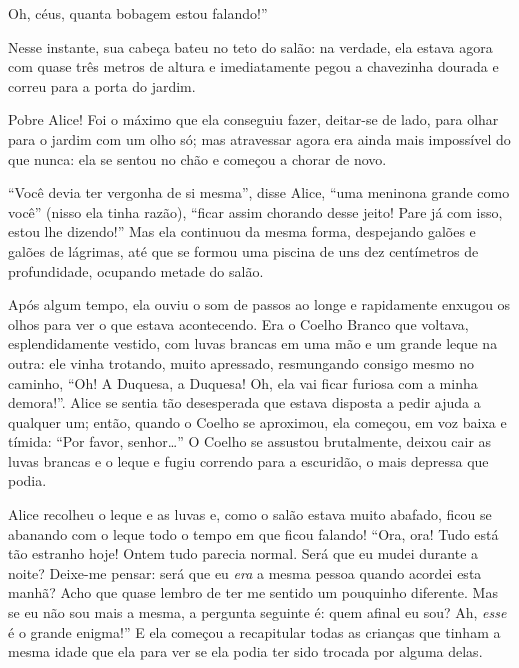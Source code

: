 Oh, céus, quanta bobagem estou falando!''

Nesse instante, sua cabeça bateu no teto do salão: na verdade, ela
estava agora com quase três metros de altura e imediatamente pegou
a chavezinha dourada e correu para a porta do jardim.

Pobre Alice! Foi o máximo que ela conseguiu fazer, deitar-se de lado,
para olhar para o jardim com um olho só; mas atravessar agora era ainda
mais impossível do que nunca: ela se sentou no chão e começou a chorar
de novo.

``Você devia ter vergonha de si mesma'', disse Alice, ``uma meninona
grande como você'' (nisso ela tinha razão), ``ficar assim chorando desse
jeito! Pare já com isso, estou lhe dizendo!'' Mas ela continuou da mesma
forma, despejando galões e galões de lágrimas, até que se formou uma
piscina de uns dez centímetros de profundidade, ocupando metade do
salão.

Após algum tempo, ela ouviu o som de passos ao longe e rapidamente
enxugou os olhos para ver o que estava acontecendo. Era o Coelho Branco
que voltava, esplendidamente vestido, com luvas brancas em uma mão e um
grande leque na outra: ele vinha trotando, muito apressado, resmungando
consigo mesmo no caminho, ``Oh! A Duquesa, a Duquesa! Oh, ela vai ficar
furiosa com a minha demora!''. Alice se sentia tão desesperada que
estava disposta a pedir ajuda a qualquer um; então, quando o Coelho se
aproximou, ela começou, em voz baixa e tímida: ``Por favor, senhor\ldots{}''
O Coelho se assustou brutalmente, deixou cair as luvas brancas e o
leque e fugiu correndo para a escuridão, o mais depressa que podia.

Alice recolheu o leque e as luvas e, como o salão estava muito abafado,
ficou se abanando com o leque todo o tempo em que ficou falando! ``Ora, ora!
Tudo está tão estranho hoje! Ontem tudo parecia normal. Será que eu
mudei durante a noite? Deixe-me pensar: será que eu \emph{era} a mesma
pessoa quando acordei esta manhã? Acho que quase lembro de ter me
sentido um pouquinho diferente. Mas se eu não sou mais a mesma, a
pergunta seguinte é: quem afinal eu sou? Ah, \emph{esse} é o grande
enigma!'' E ela começou a recapitular todas as crianças que tinham a
mesma idade que ela para ver se ela podia ter sido trocada por alguma
delas.

